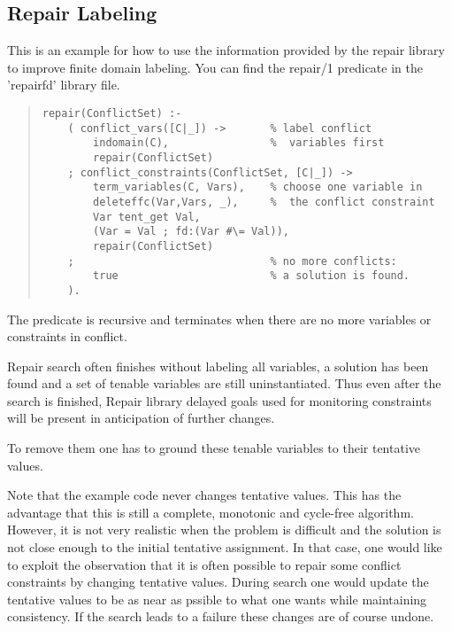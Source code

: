 \subsection{Repair Labeling}
\label{labeling}
This is an example for how to use the information provided by the repair
library to improve finite domain labeling.
You can find the repair/1 predicate in the 'repairfd' library file.
\begin{quote} \begin{verbatim}
repair(ConflictSet) :-
    ( conflict_vars([C|_]) ->       % label conflict
        indomain(C),                %  variables first
        repair(ConflictSet)
    ; conflict_constraints(ConflictSet, [C|_]) ->
        term_variables(C, Vars),    % choose one variable in
        deleteffc(Var,Vars, _),     %  the conflict constraint
        Var tent_get Val,
        (Var = Val ; fd:(Var #\= Val)),
        repair(ConflictSet)
    ;                               % no more conflicts:
        true                        % a solution is found.
    ).
\end{verbatim} \end{quote}
The predicate is recursive and terminates when there are no more variables
or constraints in conflict.

Repair search often finishes without labeling all variables, a
solution has been found and a set of tenable variables are still
uninstantiated.  Thus even after the search is finished, Repair library
delayed goals used for monitoring constraints will be present in
anticipation of further changes.

To remove them one has to ground these tenable variables to their
tentative values.

Note that the example code never changes tentative values.
This has the advantage that this is still a complete, monotonic and
cycle-free algorithm.
However, it is not very realistic when the problem is difficult and
the solution is not close enough to the initial tentative assignment.
In that case, one would like to exploit the observation that it is often
possible to repair some conflict constraints by changing tentative
values. During search one would update the tentative values to be as
near as pssible to what one wants while maintaining consistency. If the
search leads to a failure these changes are of course undone.

